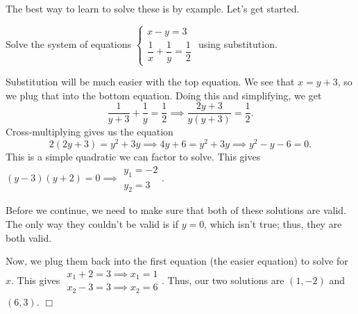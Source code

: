 \documentclass[../book.tex]{subfiles}
\begin{document}
The best way to learn to solve these is by example.  Let's get started.
\begin{example}
Solve the system of equations $\begin{cases} x-y=3 \\ \dfrac{1}{x}+\dfrac{1}{y}=\dfrac{1}{2} \end{cases}$ using substitution.
\end{example}
\begin{solution}
Substitution will be much easier with the top equation.  We see that $x=y+3$, so we plug that into the bottom equation.  Doing this and simplifying, we get $$\dfrac{1}{y+3}+\dfrac{1}{y}=\dfrac{1}{2} \implies \dfrac{2y+3}{y(y+3)}=\dfrac{1}{2}.$$  Cross-multiplying gives us the equation $$2(2y+3)=y^2+3y \implies 4y+6=y^2+3y \implies y^2-y-6=0.$$  This is a simple quadratic we can factor to solve.  This gives $(y-3)(y+2)=0 \implies \begin{matrix} y_1=-2 \\ y_2=3 \end{matrix}.$

Before we continue, we need to make sure that both of these solutions are valid.  The only way they couldn't be valid is if $y=0$, which isn't true; thus, they are both valid.

Now, we plug them back into the first equation (the easier equation) to solve for $x$.  This gives $\begin{matrix} x_1+2=3 \implies x_1=1 \\ x_2-3=3 \implies x_2=6 \end{matrix}$.  Thus, our two solutions are $\left(1,-2\right)$ and $\left(6,3\right)$.  $\Box$
\end{solution}
\end{document}
